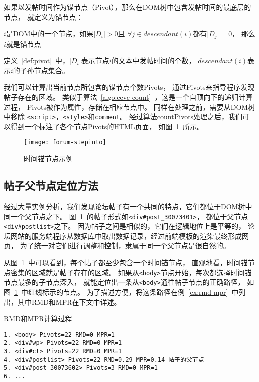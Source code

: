 如果以发帖时间作为锚节点（Pivot），那么在DOM树中包含发帖时间的最底层的节点，
就定义为锚节点：

\begin{definition}
\label{def:pivot}
$i$是DOM中的一个节点，如果$\vert D_i \vert > 0$且
$\forall j \in descendant(i)$都有$\vert D_j \vert = 0$，
那么$i$就是锚节点
\end{definition}

定义~\ref{def:pivot}~中，$\vert D_i \vert$表示节点$i$的文本中发帖时间的个数，
$descendant(i)$表示$i$的子孙节点集合。

我们可以计算出当前节点所包含的锚节点个数Pivots，
通过Pivots来指导程序发现帖子存在的区域。
类似于算法~\ref{algo:cevc-count}~，这是一个自顶向下的递归计算过程，
Pivots被作为属性，存储在相应节点中。
同样在处理之前，需要从DOM树中移除
\texttt{<script>}，\texttt{<style>}和\texttt{comment}。
经过算法countPivots处理之后，我们可以得到一个标注了各个节点Pivots的HTML页面，
如图~\ref{fig:forum-stepinto}~所示。

\begin{figure}[htbp]
\centering
\texttt{[image: forum-stepinto]}
\caption{时间锚节点示例}
\label{fig:forum-stepinto}
\end{figure}

\subsection{帖子父节点定位方法}
经过大量实例分析，我们发现论坛帖子有一个共同的特点，它们都位于DOM树中同一个父节点之下。
图~\ref{fig:forum-stepinto}~的帖子形式如\texttt{<div\#post\_30073401>}，
都位于父节点\texttt{<div\#postlist>}之下。
因为帖子之间是相似的，它们在逻辑地位上是平等的，
论坛网站的服务端程序从数据库中取出数据记录，经过前端模板的渲染最终形成网页，
为了统一对它们进行调整和控制，隶属于同一个父节点是很自然的。

从图~\ref{fig:forum-stepinto}~中可以看到，每个帖子都至少包含一个时间锚节点，
直观地看，时间锚节点密集的区域就是帖子存在的区域。
如果从\texttt{<body>}节点开始，每次都选择时间锚节点最多的子节点深入，
就能定位出一条从\texttt{<body>}通往帖子节点的正确路径，
如图~\ref{fig:forum-stepinto}~中红线标示的节点。
为了描述方便，将这条路径在例~\ref{ex:rmd-mpr}~中列出，其中RMD和MPR在下文中详述。

\begin{example}
\label{ex:rmd-mpr}
RMD和MPR计算过程
\end{example}
\begin{oframed}
\begin{verbatim}
1. <body> Pivots=22 RMD=0 MPR=1
2. <div#wp> Pivots=22 RMD=0 MPR=1
3. <div#ct> Pivots=22 RMD=0 MPR=1
4. <div#postlist> Pivots=22 RMD=0.29 MPR=0.14 帖子的父节点
5. <div#post_30073602> Pivots=3 RMD=0 MPR=1
6. ...
\end{verbatim}
\end{oframed}


